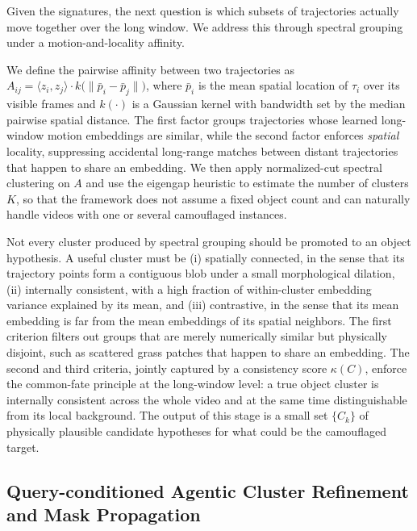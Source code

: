 \documentclass[11pt]{article}
\begin{document}
Given the signatures, the next question is which subsets of trajectories actually move together over the long window.
We address this through spectral grouping under a motion-and-locality affinity.

We define the pairwise affinity between two trajectories as
$A_{ij}=\langle z_i, z_j\rangle\cdot k\!\big(\|\bar{p}_i-\bar{p}_j\|\big)$,
where $\bar{p}_i$ is the mean spatial location of $\tau_i$ over its visible frames and $k(\cdot)$ is a Gaussian kernel with bandwidth set by the median pairwise spatial distance.
The first factor groups trajectories whose learned long-window motion embeddings are similar, while the second factor enforces \emph{spatial} locality, suppressing accidental long-range matches between distant trajectories that happen to share an embedding.
We then apply normalized-cut spectral clustering on $A$ and use the eigengap heuristic to estimate the number of clusters $K$, so that the framework does not assume a fixed object count and can naturally handle videos with one or several camouflaged instances.

Not every cluster produced by spectral grouping should be promoted to an object hypothesis.
A useful cluster must be (i) spatially connected, in the sense that its trajectory points form a contiguous blob under a small morphological dilation, (ii) internally consistent, with a high fraction of within-cluster embedding variance explained by its mean, and (iii) contrastive, in the sense that its mean embedding is far from the mean embeddings of its spatial neighbors.
The first criterion filters out groups that are merely numerically similar but physically disjoint, such as scattered grass patches that happen to share an embedding.
The second and third criteria, jointly captured by a consistency score $\kappa(C)$, enforce the common-fate principle at the long-window level: a true object cluster is internally consistent across the whole video and at the same time distinguishable from its local background.
The output of this stage is a small set $\{C_k\}$ of physically plausible candidate hypotheses for what could be the camouflaged target.

\subsection{Query-conditioned Agentic Cluster Refinement and Mask Propagation}
\end{document}
